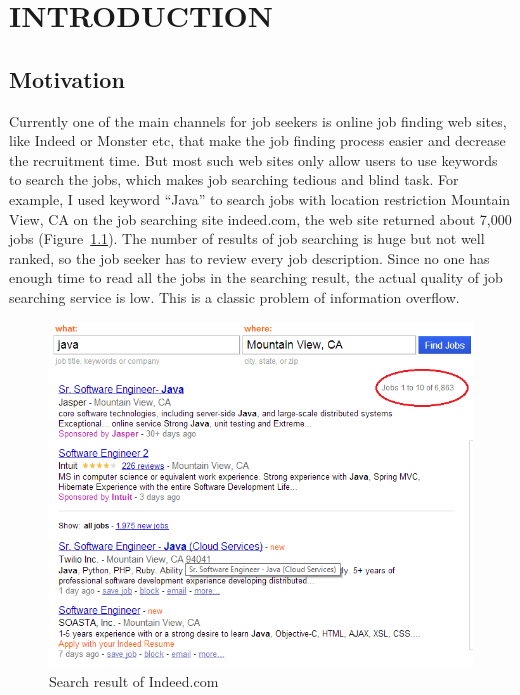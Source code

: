 \chapter{INTRODUCTION}




\section{Motivation}
Currently one of the main channels for job seekers is online job finding web sites, like Indeed or  Monster etc, that make the job finding process easier and decrease the recruitment time. But most such web sites only allow users to use keywords to search the jobs, which makes job searching tedious and blind task. For example, I used keyword ``Java'' to search jobs with location restriction Mountain View, CA on the job searching site indeed.com, the web site returned about 7,000 jobs (Figure~\ref{fig:Indeed}). The number of results of job searching is huge but not well ranked, so the job seeker has to review every job description. Since no one has enough time to read all the jobs in the searching result, the actual quality of job searching service is low. This is a classic problem of information overflow.


\begin{figure}[htbp]
  \centering
  \includegraphics[scale=0.6]{images/indeed1.png}
  \caption{Search result of Indeed.com}
  \label{fig:Indeed}
\end{figure}

